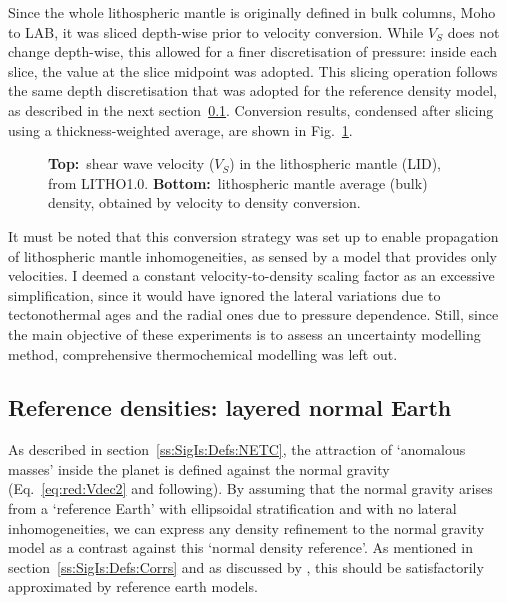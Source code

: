 Since the whole lithospheric mantle is originally defined in bulk columns, Moho to LAB, it was sliced depth-wise prior to velocity conversion.
While $V_S$ does not change depth-wise, this allowed for a finer discretisation of pressure: inside each slice, the value at the slice midpoint was adopted.
This slicing operation follows the same depth discretisation that was adopted for the reference density model, as described in the next section~\ref{ss:SigIs:InModels:REF}.
Conversion results, condensed after slicing using a thickness-weighted average, are shown in Fig.~\ref{fig:SigIs:LID_VS-density_map}.

\begin{figure}
    \begin{adjustbox}{center}
    \end{adjustbox}
    \caption[Density in the lithospheric mantle (LID) after conversion.]{
        \textbf{Top:}~shear wave velocity ($V_S$) in the lithospheric mantle (LID), from {LITHO1.0}. 
        \textbf{Bottom:}~lithospheric mantle average (bulk) density, obtained by velocity to density conversion.}
    \label{fig:SigIs:LID_VS-density_map}
\end{figure}

It must be noted that this conversion strategy was set up to enable propagation of lithospheric mantle inhomogeneities, as sensed by a model that provides only velocities.
I deemed a constant velocity-to-density scaling factor as an excessive simplification, since it would have ignored the lateral variations due to tectonothermal ages and the radial ones due to pressure dependence.
Still, since the main objective of these experiments is to assess an uncertainty modelling method, comprehensive thermochemical modelling was left out.

\subsection{Reference densities: layered normal Earth}
\label{ss:SigIs:InModels:REF}

As described in section~\ref{ss:SigIs:Defs:NETC}, the attraction of `anomalous masses' inside the planet is defined against the normal gravity  (Eq.~\ref{eq:red:Vdec2} and following).
By assuming that the normal gravity arises from a `reference Earth' with ellipsoidal stratification and with no lateral inhomogeneities, we can express any density refinement to the normal gravity model as a contrast against this `normal density reference'.
As mentioned in section~\ref{ss:SigIs:Defs:Corrs} and as discussed by \textcite{Vajda2008}, this should be satisfactorily approximated by reference earth models. \nocite{Moritz1990} \nocite{Tscherning1981} %

